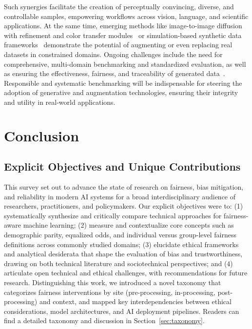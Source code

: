 \documentclass[sigconf]{acmart}
\begin{document}
Such synergies facilitate the creation of perceptually convincing, diverse, and controllable samples, empowering workflows across vision, language, and scientific applications. At the same time, emerging methods like image-to-image diffusion with refinement and color transfer modules~\cite{ref102} or simulation-based synthetic data frameworks~\cite{ref81} demonstrate the potential of augmenting or even replacing real datasets in constrained domains. Ongoing challenges include the need for comprehensive, multi-domain benchmarking and standardized evaluation, as well as ensuring the effectiveness, fairness, and traceability of generated data~\cite{ref61,ref62,ref81,ref87,ref101,ref102}. Responsible and systematic benchmarking will be indispensable for steering the adoption of generative and augmentation technologies, ensuring their integrity and utility in real-world applications.

\section{Conclusion}
\label{sec:conclusion}

\subsection{Explicit Objectives and Unique Contributions}
This survey set out to advance the state of research on fairness, bias mitigation, and reliability in modern AI systems for a broad interdisciplinary audience of researchers, practitioners, and policymakers. Our explicit objectives were to: (1) systematically synthesize and critically compare technical approaches for fairness-aware machine learning; (2) measure and contextualize core concepts such as demographic parity, equalized odds, and individual versus group-level fairness definitions across commonly studied domains; (3) elucidate ethical frameworks and analytical desiderata that shape the evaluation of bias and trustworthiness, drawing on both technical literature and sociotechnical perspectives; and (4) articulate open technical and ethical challenges, with recommendations for future research. Distinguishing this work, we introduced a novel taxonomy that categorizes fairness interventions by site (pre-processing, in-processing, post-processing) and context, and mapped key interdependencies between ethical considerations, model architectures, and AI deployment pipelines. Readers can find a detailed taxonomy and discussion in Section~\ref{sec:taxonomy}.
\end{document}
